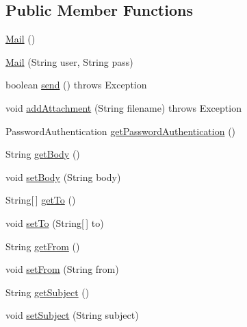 \subsection*{\-Public \-Member \-Functions}
\begin{DoxyCompactItemize}
\item 
\hyperlink{classlab_1_1davidahn_1_1appshuttle_1_1report_1_1_mail_a3ab29fe5371b6531a58416dd960ad069}{\-Mail} ()
\item 
\hyperlink{classlab_1_1davidahn_1_1appshuttle_1_1report_1_1_mail_a23b5a93953f9982d20c05e63903d1bb2}{\-Mail} (\-String user, \-String pass)
\item 
boolean \hyperlink{classlab_1_1davidahn_1_1appshuttle_1_1report_1_1_mail_af42ae99b52d0752da5bd35e4d7fb1226}{send} ()  throws Exception 
\item 
void \hyperlink{classlab_1_1davidahn_1_1appshuttle_1_1report_1_1_mail_adaf7e1a2cf5f5e87c33949837ab8e116}{add\-Attachment} (\-String filename)  throws Exception 
\item 
\-Password\-Authentication \hyperlink{classlab_1_1davidahn_1_1appshuttle_1_1report_1_1_mail_a3930f170771b2f53cb7f7f2c021cb2c3}{get\-Password\-Authentication} ()
\item 
\-String \hyperlink{classlab_1_1davidahn_1_1appshuttle_1_1report_1_1_mail_a0dc6727aa03a8108055e3160a4ebd876}{get\-Body} ()
\item 
void \hyperlink{classlab_1_1davidahn_1_1appshuttle_1_1report_1_1_mail_ab58a73149780c5853723f8e967b586dc}{set\-Body} (\-String body)
\item 
\-String\mbox{[}$\,$\mbox{]} \hyperlink{classlab_1_1davidahn_1_1appshuttle_1_1report_1_1_mail_ac7a2a8fc2a3ae47875055ab8def883c9}{get\-To} ()
\item 
void \hyperlink{classlab_1_1davidahn_1_1appshuttle_1_1report_1_1_mail_a32264cbd4afe2390d5f40ef662df2651}{set\-To} (\-String\mbox{[}$\,$\mbox{]} to)
\item 
\-String \hyperlink{classlab_1_1davidahn_1_1appshuttle_1_1report_1_1_mail_a1409b5191af0ebae095c480654939554}{get\-From} ()
\item 
void \hyperlink{classlab_1_1davidahn_1_1appshuttle_1_1report_1_1_mail_af8a8c06d1b6ae2ab0504e88208ee0df4}{set\-From} (\-String from)
\item 
\-String \hyperlink{classlab_1_1davidahn_1_1appshuttle_1_1report_1_1_mail_a03029d8ff4ed0449f4c501d2c9ee0cc1}{get\-Subject} ()
\item 
void \hyperlink{classlab_1_1davidahn_1_1appshuttle_1_1report_1_1_mail_ab86b34ab79030d324e02b1d0bd8ccdb4}{set\-Subject} (\-String subject)
\end{DoxyCompactItemize}


